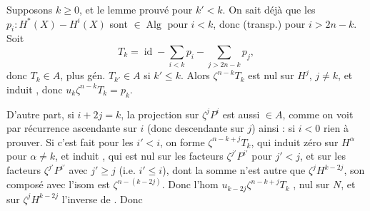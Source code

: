 
Supposons $k\geq0$, et le lemme prouvé pour $k'<k$. On sait déjà que les $p_i:H^*(X)\mathbin{-}H^i(X)$ sont $\in\operatorname{Alg}$ pour $i<k$, donc (transp.) pour $i>2n-k$. Soit
\[
T_k=\operatorname{id}-\sum_{i<k}p_i-\sum_{j>2n-k}p_j,
\]
donc $T_k\in A$, plus gén. $T_{k'}\in A$ si $k'\leq k$. Alors $\zeta^{n-k}T_k$ est nul sur $H^j$, $j\neq k$, et induit
, donc $u_k\zeta^{n-k}T_k=p_k$.

D'autre part, si $i+2j=k$,  la projection sur $\zeta^jP^i$ est aussi $\in A$, comme on voit  par récurrence ascendante sur $i$ (donc descendante sur $j$) ainsi : si $i<0$ rien à prouver. Si c'est fait pour les $i'<i$, on forme $\zeta^{n-k+j}T_k$, \deleted{$\unsure{\zeta}$} qui induit zéro sur $H^\alpha$ pour $\alpha\neq k$, et induit
, qui est nul  sur les facteurs $\zeta^{j'}P^{i'}$ pour $j'<j$,  et sur les facteurs $\zeta^{j'}P^{i'}$ avec $j'\geq j$ (i.e. $i'\leq i$),  dont la somme n'est autre que $\zeta^jH^{k-2j}$, son composé avec l'isom
est $\zeta^{n-(k-2j)}$. Donc l'hom $u_{k-2j}\zeta^{n-k+j}T_k$ , nul sur $N$, et sur $\zeta^jH^{k-2j}$ l'inverse de
. Donc

